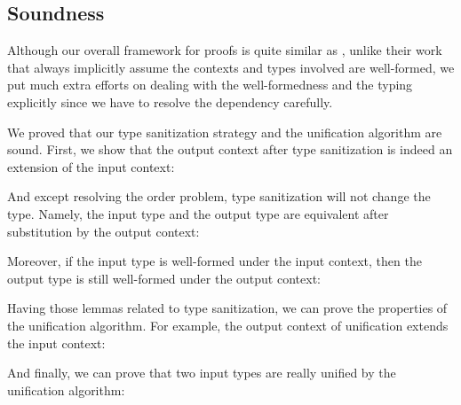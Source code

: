\subsection{Soundness}

Although our overall framework for proofs is quite similar as
\citet{dunfield2013complete}, unlike their work that always implicitly assume
the contexts and types involved are well-formed, we put much extra efforts on
dealing with the well-formedness and the typing explicitly since we have to resolve the dependency carefully.

We proved that our type sanitization strategy and the unification algorithm
are sound.
First, we show that the output context after type
sanitization is indeed an extension of the input context:

\begin{lemma}[\TypeSanitizationExtensionName]
  \TypeSanitizationExtensionBody
\end{lemma}

And except resolving the order problem, type sanitization will not change the
type. Namely, the input type and the output type are equivalent after
substitution by the output context:

\begin{lemma}[\TypeSanitizationEquivalenceName]
  \TypeSanitizationEquivalenceBody
\end{lemma}

Moreover, if the input type is well-formed under the input context, then the
output type is still well-formed under the output context:

\begin{lemma}[\TypeSanitizationWellFormednessName]
  \TypeSanitizationWellFormednessBody
\end{lemma}

Having those lemmas related to type sanitization, we can prove the properties of
the unification algorithm. For example, the output context of unification
extends the input context:

\begin{lemma}[\UnificationExtensionName]\leavevmode
  \UnificationExtensionBody
\end{lemma}

And finally, we can prove that two input types are really unified by the
unification algorithm:

\begin{lemma}[\UnificationEquivalenceName]\leavevmode
  \UnificationEquivalenceBody
\end{lemma}

